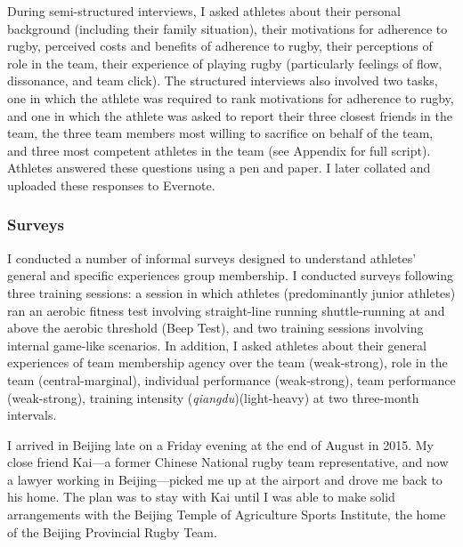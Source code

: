 During semi-structured interviews, I asked athletes about their personal background (including their family situation), their motivations for adherence to rugby, perceived costs and benefits of adherence to rugby, their perceptions of role in the team, their experience of playing rugby (particularly feelings of flow, dissonance, and team click).  The structured interviews also involved two tasks, one in which the athlete was required to rank motivations for adherence to rugby, and one in which the athlete was asked to report their three closest friends in the team, the three team members most willing to sacrifice on behalf of the team, and three most competent athletes in the team (see Appendix for full script). Athletes answered these questions using a pen and paper. I later collated and uploaded these responses to Evernote.


\subsubsection{Surveys}
 I conducted a number of informal surveys designed to understand athletes' general and specific experiences group membership.  I conducted surveys following three training sessions: a session in which athletes (predominantly junior athletes) ran an aerobic fitness test involving straight-line running shuttle-running at and above the aerobic threshold (Beep Test), and two training sessions involving internal game-like scenarios.  In addition, I asked athletes about their general experiences of team membership agency over the team (weak-strong), role in the team (central-marginal), individual performance (weak-strong), team performance (weak-strong), training intensity (\textit{qiangdu})(light-heavy) at two three-month intervals.

















I arrived in Beijing late on a Friday evening at the end of August in 2015.  My close friend Kai---a former Chinese National rugby team representative, and now a lawyer working in Beijing---picked me up at the airport and drove me back to his home.  The plan was to stay with Kai until I was able to make solid arrangements with the Beijing Temple of Agriculture Sports Institute, the home of the Beijing Provincial Rugby Team.

